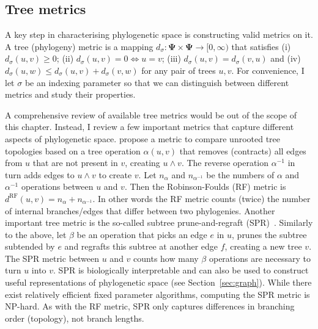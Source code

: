 \subsection{Tree metrics}
\label{sec:metrics}

A key step in characterising phylogenetic space is constructing valid metrics on it.
A tree (phylogeny) metric is a mapping $d_\sigma : \boldsymbol \Psi \times \boldsymbol \Psi \to [0, \infty)$ that satisfies (i) $d_\sigma(u, v) \geq 0$; (ii) $d_\sigma(u, v) = 0 \iff u = v$;  (iii) $d_\sigma(u, v) = d_\sigma(v, u)$ and (iv) $d_\sigma(u, w) \leq d_\sigma(u, v) + d_\sigma(v, w)$ for any pair of trees $u, v$. 
For convenience, I let $\sigma$ be an indexing parameter so that we can distinguish between different metrics and study their properties.

A comprehensive review of available tree metrics would be out of the scope of this chapter.
Instead, I review a few important metrics that capture different aspects of phylogenetic space.
\cite{Robinson1981} propose a metric to compare unrooted tree topologies based on a tree operation $\alpha(u, v)$ that removes (contracts) all edges from $u$ that are not present in $v$, creating $u \wedge v$.
The reverse operation $\alpha^{-1}$ in turn adds edges to $u \wedge v$ to create $v$.
Let $n_\alpha$ and $n_{\alpha^{-1}}$ be the numbers of $\alpha$ and $\alpha^{-1}$ operations between $u$ and $v$.
Then the Robinson-Foulds (RF) metric is $d^{\text{RF}}(u, v) = n_\alpha + n_{\alpha^{-1}}$.
In other words the RF metric counts (twice) the number of internal branches/edges that differ between two phylogenies.
Another important tree metric is the so-called subtree prune-and-regraft (SPR)~\citep{Allen2001}.
Similarly to the above, let $\beta$ be an operation that picks an edge $e$ in $u$, prunes the subtree subtended by $e$ and regrafts this subtree at another edge $f$, creating a new tree $v$.
The SPR metric between $u$ and $v$ counts how many $\beta$ operations are necessary to turn $u$ into $v$. 
SPR is biologically interpretable and can also be used to construct useful representations of phylogenetic space (see Section~\ref{sec:graph}).
While there exist relatively efficient fixed parameter algorithms, computing the SPR metric is NP-hard.
As with the RF metric, SPR only captures differences in branching order (topology), not branch lengths.

